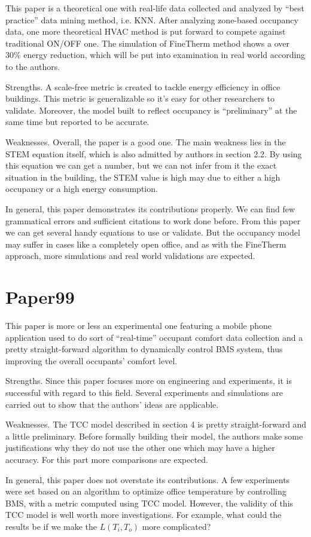 \documentclass{article}
\begin{document}
This paper is a theoretical one with real-life data collected and
analyzed by ``best practice'' data mining method, i.e. KNN\@. After
analyzing zone-based occupancy data, one more theoretical HVAC method
is put forward to compete against traditional ON/OFF one. The
simulation of FineTherm method shows a over 30\% energy reduction,
which will be put into examination in real world according to the
authors.
\par
Strengths. A scale-free metric is created to tackle energy efficiency
in office buildings. This metric is generalizable so it's easy for
other researchers to validate. Moreover, the model built to reflect
occupancy is ``preliminary'' at the same time but reported to be
accurate. 
\par
Weaknesses. Overall, the paper is a good one. The main weakness lies
in the STEM equation itself, which is also admitted by authors in
section 2.2. By using this equation we can get a number, but we can
not infer from it the exact situation in the building, the STEM value
is high may due to either a high occupancy or a high energy
consumption. 
\par
In general, this paper demonstrates its contributions properly. We can
find few grammatical errors and sufficient citations to work done
before. From this paper we can get several handy equations to use or
validate. But the occupancy model may suffer in cases like a
completely open office, and as with the FineTherm approach, more
simulations and real world validations are expected.

\section{Paper99}
\label{sec:paper99}

This paper is more or less an experimental one featuring a mobile
phone application used to do sort of ``real-time'' occupant comfort
data collection and a pretty straight-forward algorithm to dynamically
control BMS system, thus improving the overall occupants' comfort
level. 
\par
Strengths. Since this paper focuses more on engineering and
experiments, it is successful with regard to this field. Several
experiments and simulations are carried out to show that the authors'
ideas are applicable. 
\par
Weaknesses. The TCC model described in section 4 is pretty
straight-forward and a little preliminary. Before formally building
their model, the authors make some justifications why they do not use
the other one which may have a higher accuracy. For this part more
comparisons are expected.
\par
In general, this paper does not overstate its contributions. A few
experiments were set based on an algorithm to optimize office
temperature by controlling BMS, with a metric computed using TCC
model. However, the validity of this TCC model is well worth more
investigations. For example, what could the results be if we make the
$L(T_{i},T_{o})$ more complicated?
\end{document}
